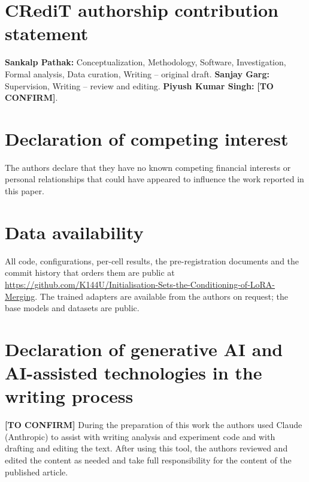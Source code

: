 
\section*{CRediT authorship contribution statement}
\textbf{Sankalp Pathak:} Conceptualization, Methodology, Software,
Investigation, Formal analysis, Data curation, Writing -- original draft.
\textbf{Sanjay Garg:} Supervision, Writing -- review and editing.
\textbf{Piyush Kumar Singh:} \textbf{[TO CONFIRM]}.

\section*{Declaration of competing interest}
The authors declare that they have no known competing financial interests or
personal relationships that could have appeared to influence the work reported
in this paper.

\section*{Data availability}
All code, configurations, per-cell results, the pre-registration documents and
the commit history that orders them are public at
\url{https://github.com/K144U/Initialisation-Sets-the-Conditioning-of-LoRA-Merging}.
The trained adapters are available from the authors on request; the base
models and datasets are public.

\section*{Declaration of generative AI and AI-assisted technologies in the
writing process}
\textbf{[TO CONFIRM]} During the preparation of this work the authors used
Claude (Anthropic) to assist with writing analysis and experiment code and
with drafting and editing the text. After using this tool, the authors
reviewed and edited the content as needed and take full responsibility for
the content of the published article.
